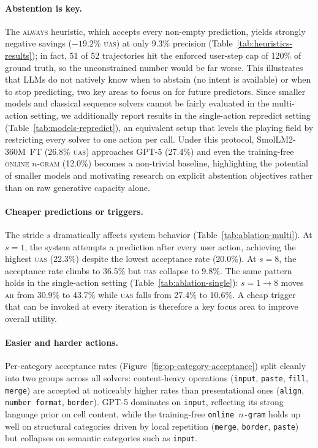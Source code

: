 \documentclass{article}
\newcommand{\op}[1]{\texttt{\small #1}}
\theoremstyle{plain}
\theoremstyle{definition}
\theoremstyle{remark}
\begin{document}
\paragraph{Abstention is key.}

The \textsc{always} heuristic, which accepts every non-empty prediction, yields strongly negative savings ($-19.2$\% \textsc{uas}) at only 9.3\% precision (Table~\ref{tab:heuristics-results}); in fact, 51 of 52 trajectories hit the enforced user-step cap of 120\% of ground truth, so the unconstrained number would be far worse.
This illustrates that LLMs do not natively know when to abstain (no intent is available) or when to stop predicting, two key areas to focus on for future predictors.
Since smaller models and classical sequence solvers cannot be fairly evaluated in the multi-action setting, we additionally report results in the single-action repredict setting (Table~\ref{tab:models-repredict}), an equivalent setup that levels the playing field by restricting every solver to one action per call.
Under this protocol, \mbox{SmolLM2-360M FT} (26.8\% \textsc{uas}) approaches GPT-5 (27.4\%) and even the training-free \textsc{online $n$-gram} (12.0\%) becomes a non-trivial baseline, highlighting the potential of smaller models and motivating research on explicit abstention objectives rather than on raw generative capacity alone.


\paragraph{Cheaper predictions or triggers.}

The stride $s$ dramatically affects system behavior (Table~\ref{tab:ablation-multi}).
At $s{=}1$, the system attempts a prediction after every user action, achieving the highest \textsc{uas} (22.3\%) despite the lowest acceptance rate (20.0\%).
At $s{=}8$, the acceptance rate climbs to 36.5\% but \textsc{uas} collapse to 9.8\%.
The same pattern holds in the single-action setting (Table~\ref{tab:ablation-single}): $s{=}1\!\to\!8$ moves \textsc{ar} from 30.9\% to 43.7\% while \textsc{uas} falls from 27.4\% to 10.6\%.
A cheap trigger that can be invoked at every iteration is therefore a key focus area to improve overall utility.

\paragraph{Easier and harder actions.}
Per-category acceptance rates (Figure~\ref{fig:op-category-acceptance}) split cleanly into two groups across all solvers: content-heavy operations (\op{input}, \op{paste}, \op{fill}, \op{merge}) are accepted at noticeably higher rates than presentational ones (\op{align}, \op{number format}, \op{border}).
GPT-5 dominates on \op{input}, reflecting its strong language prior on cell content, while the training-free \op{online $n$-gram} holds up well on structural categories driven by local repetition (\op{merge}, \op{border}, \op{paste}) but collapses on semantic categories such as \op{input}.
\end{document}
